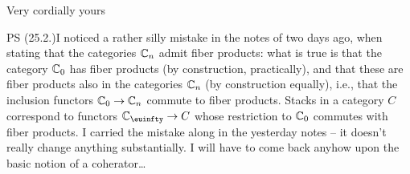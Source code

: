 \bigskip

Very cordially yours

\bigskip

PS (25.2.)\enspace I noticed a rather silly mistake in the notes of two days
ago, when stating that the categories ${\mathbb{C}}_n$ admit fiber products:
what is true is that the category ${\mathbb{C}}_0$ has fiber products (by
construction, practically), and that these are fiber products also in
the categories ${\mathbb{C}}_n$ (by construction equally), i.e., that the
inclusion functors ${\mathbb{C}}_0 \to {\ensuremath{\mathbb{C}}}_n$ commute to fiber
products. Stacks in a category $C$ correspond to functors $\bC_\oo\to
C$ whose restriction to ${\mathbb{C}}_0$ commutes with fiber
products. I carried the mistake along in the yesterday notes -- it
doesn't really change anything substantially. I will have to come back
anyhow upon the basic notion of a coherator\ldots

